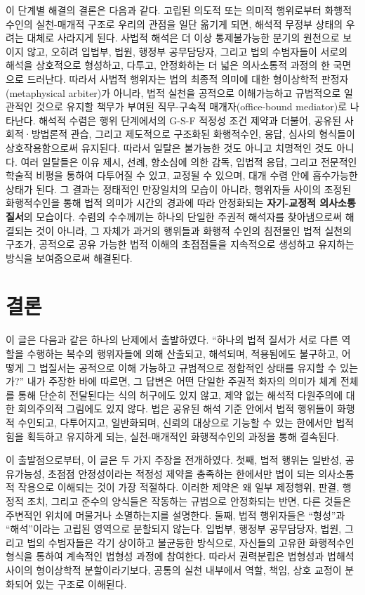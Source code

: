 \documentclass[12pt,a4paper]{article}
\begin{document}
이 단계별 해결의 결론은 다음과 같다. 고립된 의도적 또는 의미적
행위로부터 화행적수인의 실천-매개적 구조로 우리의 관점을 일단 옮기게
되면, 해석적 무정부 상태의 우려는 대체로 사라지게 된다. 사법적 해석은 더
이상 통제불가능한 분기의 원천으로 보이지 않고, 오히려 입법부, 법원,
행정부 공무담당자, 그리고 법의 수범자들이 서로의 해석을 상호적으로
형성하고, 다투고, 안정화하는 더 넓은 의사소통적 과정의 한 국면으로
드러난다. 따라서 사법적 행위자는 법의 최종적 의미에 대한 형이상학적
판정자(metaphysical arbiter)가 아니라, 법적 실천을 공적으로 이해가능하고
규범적으로 일관적인 것으로 유지할 책무가 부여된 직무-구속적
매개자(office-bound mediator)로 나타난다. 해석적 수렴은 행위 단계에서의
G-S-F 적정성 조건 제약과 더불어, 공유된 사회적·방법론적 관습, 그리고
제도적으로 구조화된 화행적수인, 응답, 심사의 형식들이 상호작용함으로써
유지된다. 따라서 일탈은 불가능한 것도 아니고 치명적인 것도 아니다. 여러
일탈들은 이유 제시, 선례, 항소심에 의한 감독, 입법적 응답, 그리고
전문적인 학술적 비평을 통하여 다투어질 수 있고, 교정될 수 있으며, 대개
수렴 안에 흡수가능한 상태가 된다. 그 결과는 정태적인 만장일치의 모습이
아니라, 행위자들 사이의 조정된 화행적수인을 통해 법적 의미가 시간의
경과에 따라 안정화되는 \textbf{자기-교정적 의사소통 질서}의 모습이다.
수렴의 수수께끼는 하나의 단일한 주권적 해석자를 찾아냄으로써 해결되는
것이 아니라, 그 자체가 과거의 행위들과 화행적 수인의 침전물인 법적
실천의 구조가, 공적으로 공유 가능한 법적 이해의 초점점들을 지속적으로
생성하고 유지하는 방식을 보여줌으로써 해결된다.

\section{결론}

이 글은 다음과 같은 하나의 난제에서 출발하였다. ``하나의 법적 질서가
서로 다른 역할을 수행하는 복수의 행위자들에 의해 산출되고, 해석되며,
적용됨에도 불구하고, 어떻게 그 법질서는 공적으로 이해 가능하고
규범적으로 정합적인 상태를 유지할 수 있는가?'' 내가 주장한 바에 따르면,
그 답변은 어떤 단일한 주권적 화자의 의미가 체계 전체를 통해 단순히
전달된다는 식의 허구에도 있지 않고, 제약 없는 해석적 다원주의에 대한
회의주의적 그림에도 있지 않다. 법은 공유된 해석 기준 안에서 법적
행위들이 화행적 수인되고, 다투어지고, 일반화되며, 신뢰의 대상으로 기능할
수 있는 한에서만 법적 힘을 획득하고 유지하게 되는, 실천-매개적인
화행적수인의 과정을 통해 결속된다.

이 출발점으로부터, 이 글은 두 가지 주장을 전개하였다. 첫째, 법적 행위는
일반성, 공유가능성, 초점점 안정성이라는 적정성 제약을 충족하는 한에서만
법이 되는 의사소통적 작용으로 이해되는 것이 가장 적절하다. 이러한 제약은
왜 일부 제정행위, 판결, 행정적 조치, 그리고 준수의 양식들은 작동하는
규범으로 안정화되는 반면, 다른 것들은 주변적인 위치에 머물거나
소멸하는지를 설명한다. 둘째, 법적 행위자들은 ``형성''과 ``해석''이라는
고립된 영역으로 분할되지 않는다. 입법부, 행정부 공무담당자, 법원, 그리고
법의 수범자들은 각기 상이하고 불균등한 방식으로, 자신들의 고유한
화행적수인 형식을 통하여 계속적인 법형성 과정에 참여한다. 따라서
권력분립은 법형성과 법해석 사이의 형이상학적 분할이라기보다, 공통의 실천
내부에서 역할, 책임, 상호 교정이 분화되어 있는 구조로 이해된다.
\end{document}
